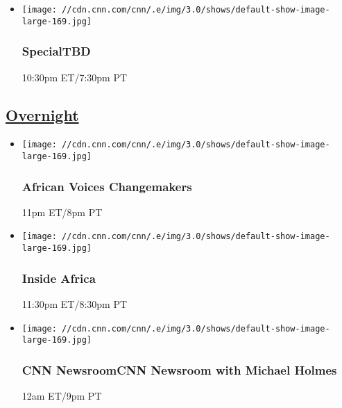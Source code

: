\begin{itemize}
\item
  \texttt{[image: //cdn.cnn.com/cnn/.e/img/3.0/shows/default-show-image-large-169.jpg]}

  \hypertarget{specialtbd--3}{%
  \subsubsection{SpecialTBD }\label{specialtbd--3}}

  10:30pm ET/7:30pm PT
\end{itemize}

\hypertarget{overnight-}{%
\subsection{\texorpdfstring{\href{/tv/schedule/cnn/index.html}{Overnight}~}{Overnight~}}\label{overnight-}}

\begin{itemize}
\item
  \texttt{[image: //cdn.cnn.com/cnn/.e/img/3.0/shows/default-show-image-large-169.jpg]}

  \hypertarget{african-voices-changemakers-2}{%
  \subsubsection{African Voices
  Changemakers}\label{african-voices-changemakers-2}}

  11pm ET/8pm PT
\end{itemize}

\begin{itemize}
\item
  \texttt{[image: //cdn.cnn.com/cnn/.e/img/3.0/shows/default-show-image-large-169.jpg]}

  \hypertarget{inside-africa-3}{%
  \subsubsection{Inside Africa}\label{inside-africa-3}}

  11:30pm ET/8:30pm PT
\end{itemize}

\begin{itemize}
\item
  \texttt{[image: //cdn.cnn.com/cnn/.e/img/3.0/shows/default-show-image-large-169.jpg]}

  \hypertarget{cnn-newsroomcnn-newsroom-with-michael-holmes-}{%
  \subsubsection{CNN NewsroomCNN Newsroom with Michael Holmes
  }\label{cnn-newsroomcnn-newsroom-with-michael-holmes-}}

  12am ET/9pm PT
\end{itemize}

